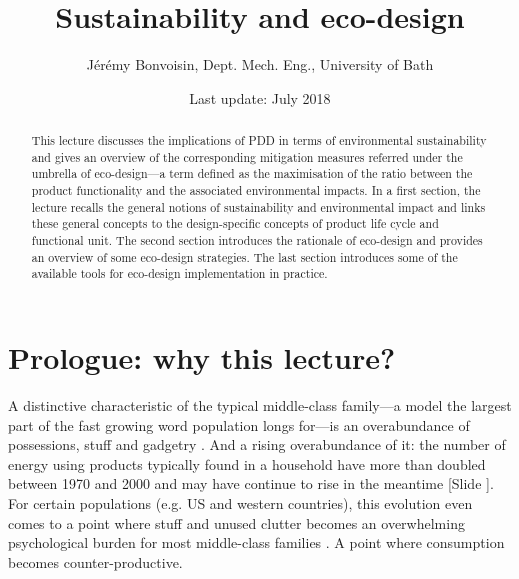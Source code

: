 \documentclass{article}
\newcounter{slide}
\newcommand{\subtitle}[1]{%
  \posttitle{%
    \par\end{center}
    \begin{center}\large#1\end{center}
    \vskip0.5em}%
}
\begin{document}
\title{Sustainability and eco-design}
\author{Jérémy Bonvoisin, Dept. Mech. Eng., University of Bath}
\date{Last update: July 2018}

\maketitle

\begin{abstract}
This lecture discusses the implications of PDD in terms of environmental sustainability and gives an overview of the corresponding mitigation measures referred under the umbrella of eco-design---a term defined as the maximisation of the ratio between the product functionality and the associated environmental impacts. In a first section, the lecture recalls the general notions of sustainability and environmental impact and links these general concepts to the design-specific concepts of product life cycle and functional unit. The second section introduces the rationale of eco-design and provides an overview of some eco-design strategies. The last section introduces some of the available tools for eco-design implementation in practice. 
\end{abstract}

\tableofcontents

\section{Prologue: why this lecture?}
\label{sec:prologue}
A distinctive characteristic of the typical middle-class family---a model the largest part of the fast growing word population longs for---is an overabundance of possessions, stuff and gadgetry \cite{menzelMaterialWorldGlobal1995}. And a rising overabundance of it: the number of energy using products typically found in a household have more than doubled between 1970 and 2000 \cite{owenRiseMachinesReview2006} and may have continue to rise in the meantime {\color{blue}[Slide ]}. For certain populations (e.g. US and western countries), this evolution even comes to a point where stuff and unused clutter becomes an overwhelming psychological burden for most middle-class families \cite{arnoldChangingAmericanHome2007}. A point where consumption becomes counter-productive.
\end{document}
